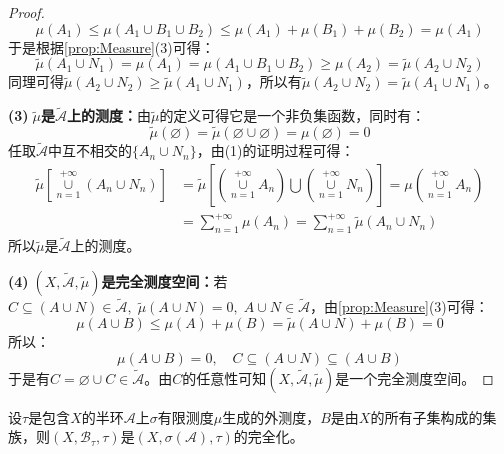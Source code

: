 \begin{proof}
	\begin{equation*}
		\mu(A_1)\leqslant\mu(A_1\cup B_1\cup B_2)\leqslant\mu(A_1)+\mu(B_1)+\mu(B_2)=\mu(A_1)
	\end{equation*}
	于是根据\cref{prop:Measure}(3)可得：
	\begin{equation*}
		\tilde{\mu}(A_1\cup N_1)=\mu(A_1)=\mu(A_1\cup B_1\cup B_2)\geqslant\mu(A_2)=\tilde{\mu}(A_2\cup N_2)
	\end{equation*}
	同理可得$\tilde{\mu}(A_2\cup N_2)\geqslant\tilde{\mu}(A_1\cup N_1)$，所以有$\tilde{\mu}(A_2\cup N_2)=\tilde{\mu}(A_1\cup N_1)$。\par
	\textbf{(3)$\;\tilde{\mu}$是$\tilde{\mathscr{A}}$上的测度：}由$\tilde{\mu}$的定义可得它是一个非负集函数，同时有：
	\begin{equation*}
		\tilde{\mu}(\varnothing)=\tilde{\mu}(\varnothing\cup\varnothing)=\mu(\varnothing)=0
	\end{equation*}
	任取$\tilde{\mathscr{A}}$中互不相交的$\{A_n\cup N_n\}$，由(1)的证明过程可得：
	\begin{align*}
		\tilde{\mu}\left[\underset{n=1}{\overset{+\infty}{\cup}}(A_n\cup N_n)\right]&=\tilde{\mu}\left[\left(\underset{n=1}{\overset{+\infty}{\cup}}A_n\right)\bigcup\left(\underset{n=1}{\overset{+\infty}{\cup}}N_n\right)\right]=\mu\left(\underset{n=1}{\overset{+\infty}{\cup}}A_n\right) \\
		&=\sum_{n=1}^{+\infty}\mu(A_n)=\sum_{n=1}^{+\infty}\tilde{\mu}(A_n\cup N_n)
	\end{align*}
	所以$\tilde{\mu}$是$\tilde{\mathscr{A}}$上的测度。\par
	\textbf{(4)$\;(X,\tilde{\mathscr{A}},\tilde{\mu})$是完全测度空间：}若$C\subseteq(A\cup N)\in\tilde{\mathscr{A}},\;\tilde{\mu}(A\cup N)=0,\;A\cup N\in\tilde{\mathscr{A}}$，由\cref{prop:Measure}(3)可得：
	\begin{equation*}
		\mu(A\cup B)\leqslant\mu(A)+\mu(B)=\tilde{\mu}(A\cup N)+\mu(B)=0
	\end{equation*}
	所以：
	\begin{equation*}
		\mu(A\cup B)=0,\quad C\subseteq(A\cup N)\subseteq(A\cup B)
	\end{equation*}
	于是有$C=\varnothing\cup C\in\tilde{\mathscr{A}}$。由$C$的任意性可知$(X,\tilde{\mathscr{A}},\tilde{\mu})$是一个完全测度空间。
\end{proof}
\begin{theorem}
	设$\tau$是包含$X$的半环$\mathscr{A}$上$\sigma$有限测度$\mu$生成的外测度，$B$是由$X$的所有子集构成的集族，则$(X,\mathscr{B}_\tau,\tau)$是$(X,\sigma(\mathscr{A}),\tau)$的完全化。
\end{theorem}
